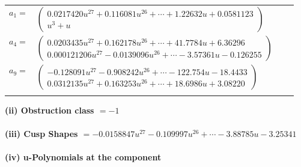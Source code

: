 \documentclass[1p]{elsarticle_modified}
\theoremstyle{definition}
\begin{document}
\begin{tabular}{m{7pt} m{180pt} m{7pt} m{180pt} }
\flushright $a_{1}=$&$\begin{pmatrix}0.0217420 u^{27}+0.116081 u^{26}+\cdots+1.22632 u+0.0581123\\u^3+u\end{pmatrix}$ \\
\flushright $a_{4}=$&$\begin{pmatrix}0.0203435 u^{27}+0.162178 u^{26}+\cdots+41.7784 u+6.36296\\0.000121206 u^{27}-0.0139096 u^{26}+\cdots-3.57361 u-0.126255\end{pmatrix}$ \\
\flushright $a_{9}=$&$\begin{pmatrix}-0.128091 u^{27}-0.908242 u^{26}+\cdots-122.754 u-18.4433\\0.0312135 u^{27}+0.163253 u^{26}+\cdots+18.6986 u+3.08220\end{pmatrix}$\\&\end{tabular}
\flushleft \textbf{(ii) Obstruction class $= -1$}\\~\\
\flushleft \textbf{(iii) Cusp Shapes $= -0.0158847 u^{27}-0.109997 u^{26}+\cdots-3.88785 u-3.25341$}\\~\\
\newpage\renewcommand{\arraystretch}{1}
\flushleft \textbf{(iv) u-Polynomials at the component}\newline \\
\end{document}
